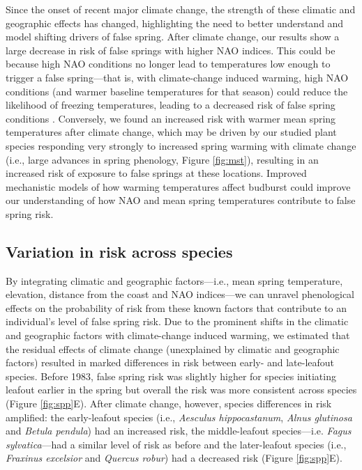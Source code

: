 \documentclass{article}\usepackage[]{graphicx}\usepackage[]{color}
\begin{document}
Since the onset of recent major climate change, the strength of these climatic and geographic effects has changed, highlighting the need to better understand and model shifting drivers of false spring. After climate change, our results show a large decrease in risk of false springs with higher NAO indices. This could be because high NAO conditions no longer lead to temperatures low enough to trigger a false spring---that is, with climate-change induced warming, high NAO conditions (and warmer baseline temperatures for that season) could reduce the likelihood of freezing temperatures, leading to a decreased risk of false spring conditions \citep{Screen2017}. Conversely, we found an increased risk with warmer mean spring temperatures after climate change, which may be driven by our studied plant species responding very strongly to increased spring warming with climate change (i.e., large advances in spring phenology, Figure \ref{fig:mst}), resulting in an increased risk of exposure to false springs at these locations. Improved mechanistic models of how warming temperatures affect budburst \citep{Gauzere2019,Gauzere2017,Chuine2016} could improve our understanding of how NAO and mean spring temperatures contribute to false spring risk.  

\subsection*{Variation in risk across species} 
By integrating climatic and geographic factors---i.e., mean spring temperature, elevation, distance from the coast and NAO indices---we can unravel phenological effects on the probability of risk from these known factors that contribute to an individual's level of false spring risk. Due to the prominent shifts in the climatic and geographic factors with climate-change induced warming, we estimated that the residual effects of climate change (unexplained by climatic and geographic factors) resulted in marked differences in risk between early- and late-leafout species. Before 1983, false spring risk was slightly higher for species initiating leafout earlier in the spring but overall the risk was more consistent across species (Figure \ref{fig:spp}E). After climate change, however, species differences in risk amplified: the early-leafout species (i.e., \textit{Aesculus hippocastanum}, \textit{Alnus glutinosa} and \textit{Betula pendula}) had an increased risk, the middle-leafout species---i.e. \textit{Fagus sylvatica}---had a similar level of risk as before and the later-leafout species (i.e., \textit{Fraxinus excelsior} and \textit{Quercus robur}) had a decreased risk (Figure \ref{fig:spp}E). 
\end{document}
